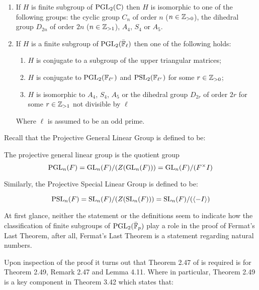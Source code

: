 \begin{enumerate}
    \item If $H$ is finite subgroup of $\operatorname{PGL}_2(\mathbb{C})$ then $H$ is isomorphic to one of the following groups: the cyclic group $C_n$ of order $n$ ($n \in \mathbb{Z}_{>0}$), the dihedral group $D_{2n}$ of order $2n$ ($n \in \mathbb{Z}_{>1}$), $A_4$, $S_4$ or $A_5$.
\item If $H$ is a finite subgroup of $\operatorname{PGL}_2(\bar{\mathbb{F}}_\ell)$ then one of the following holds:
\begin{enumerate}
    \item $H$ is conjugate to a subgroup of the upper triangular matrices;
    \item $H$ is conjugate to $\operatorname{PGL}_2(\mathbb{F}_{\ell^r})$ and $\operatorname{PSL}_2(\mathbb{F}_{\ell^{r}})$ for some $r \in \mathbb{Z}_{>0}$;
    \item $H$ is isomorphic to $A_4$, $S_4$, $A_5$ or the dihedral group $D_{2r}$ of order $2r$ for some $r \in \mathbb{Z}_{>1}$ not divisible by $\ell$

\end{enumerate}
    Where $\ell$ is assumed to be an odd prime.
\end{enumerate}

Recall that the Projective General Linear Group is defined to be:

\begin{definition}
    The projective general linear group is the quotient group
    \[    
    \operatorname{PGL}_n(F) = \operatorname{GL}_n(F) / (Z(\operatorname{GL}_n(F))) = \operatorname{GL}_n(F) / (F^\times I) 
    \]
\end{definition}

Similarly, the Projective Special Linear Group is defined to be:

\begin{lemma}
    \[
    \operatorname{PSL}_n(F) = \operatorname{SL}_n(F) / (Z(\operatorname{SL}_n(F))) = \operatorname{SL}_n(F) / (\langle -I\rangle)
    \]
\end{lemma}

At first glance, neither the statement or the definitions seem to indicate how the classification of finite subgroups of $\operatorname{PGL}_2(\bar{\mathbb{F}}_p)$ play a role in the proof of Fermat's Last Theorem, after all, Fermat's Last Theorem is a statement
regarding natural numbers. 

Upon inspection of the proof it turns out that Theorem 2.47 of \cite{dtt} is required is for Theorem 2.49, Remark 2.47 and Lemma 4.11. Where in particular, Theorem 2.49 is a key component in Theorem 3.42 which states that:


